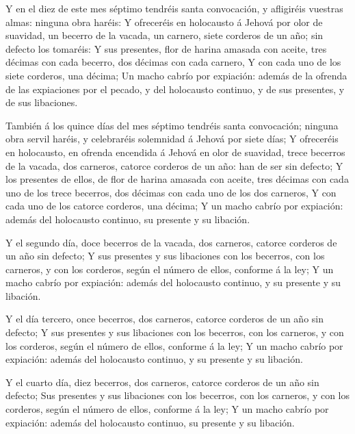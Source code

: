  Y en el diez de este mes séptimo tendréis santa
convocación, y afligiréis vuestras almas: ninguna obra haréis:
 Y ofreceréis en holocausto á Jehová por olor de suavidad,
un becerro de la vacada, un carnero, siete corderos de un año; sin
defecto los tomaréis:  Y sus presentes, flor de harina
amasada con aceite, tres décimas con cada becerro, dos décimas con cada
carnero,  Y con cada uno de los siete corderos, una décima;
 Un macho cabrío por expiación: además de la ofrenda de las
expiaciones por el pecado, y del holocausto continuo, y de sus
presentes, y de sus libaciones.

 También á los quince días del mes séptimo tendréis santa
convocación; ninguna obra servil haréis, y celebraréis solemnidad á
Jehová por siete días;  Y ofreceréis en holocausto, en
ofrenda encendida á Jehová en olor de suavidad, trece becerros de la
vacada, dos carneros, catorce corderos de un año: han de ser sin
defecto;  Y los presentes de ellos, de flor de harina
amasada con aceite, tres décimas con cada uno de los trece becerros, dos
décimas con cada uno de los dos carneros,  Y con cada uno
de los catorce corderos, una décima;  Y un macho cabrío por
expiación: además del holocausto continuo, su presente y su libación.

 Y el segundo día, doce becerros de la vacada, dos
carneros, catorce corderos de un año sin defecto;  Y sus
presentes y sus libaciones con los becerros, con los carneros, y con los
corderos, según el número de ellos, conforme á la ley;  Y
un macho cabrío por expiación: además del holocausto continuo, y su
presente y su libación.

 Y el día tercero, once becerros, dos carneros, catorce
corderos de un año sin defecto;  Y sus presentes y sus
libaciones con los becerros, con los carneros, y con los corderos, según
el número de ellos, conforme á la ley;  Y un macho cabrío
por expiación: además del holocausto continuo, y su presente y su
libación.

 Y el cuarto día, diez becerros, dos carneros, catorce
corderos de un año sin defecto;  Sus presentes y sus
libaciones con los becerros, con los carneros, y con los corderos, según
el número de ellos, conforme á la ley;  Y un macho cabrío
por expiación: además del holocausto continuo, su presente y su
libación.

